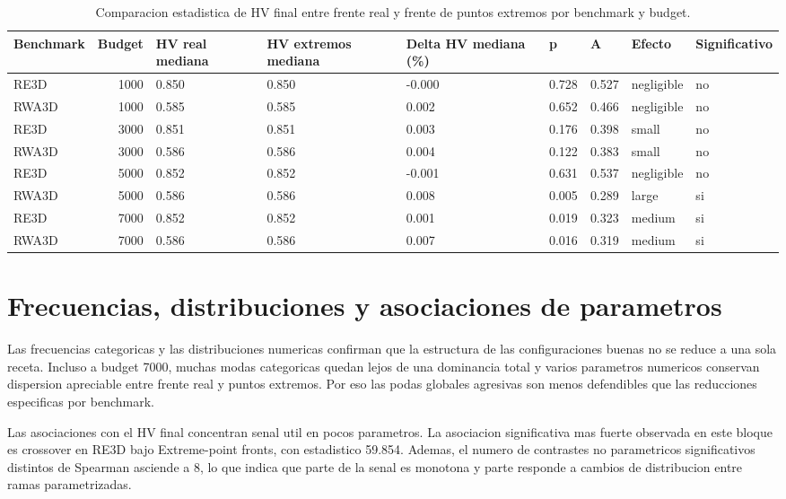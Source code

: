 \documentclass[11pt,a4paper]{article}
\begin{document}
{\scriptsize
\begin{table}[p]
\centering
\caption{Comparacion estadistica de HV final entre frente real y frente de puntos extremos por benchmark y budget.}
\label{tab:front_type_stats}
\begin{tabular}{lrlllllll}
\toprule
Benchmark & Budget & HV real mediana & HV extremos mediana & Delta HV mediana (\%) & p & A & Efecto & Significativo \\
\midrule
RE3D & 1000 & 0.850 & 0.850 & -0.000 & 0.728 & 0.527 & negligible & no \\
RWA3D & 1000 & 0.585 & 0.585 & 0.002 & 0.652 & 0.466 & negligible & no \\
RE3D & 3000 & 0.851 & 0.851 & 0.003 & 0.176 & 0.398 & small & no \\
RWA3D & 3000 & 0.586 & 0.586 & 0.004 & 0.122 & 0.383 & small & no \\
RE3D & 5000 & 0.852 & 0.852 & -0.001 & 0.631 & 0.537 & negligible & no \\
RWA3D & 5000 & 0.586 & 0.586 & 0.008 & 0.005 & 0.289 & large & si \\
RE3D & 7000 & 0.852 & 0.852 & 0.001 & 0.019 & 0.323 & medium & si \\
RWA3D & 7000 & 0.586 & 0.586 & 0.007 & 0.016 & 0.319 & medium & si \\
\bottomrule
\end{tabular}
\end{table}

}

\section{Frecuencias, distribuciones y asociaciones de parametros}

Las frecuencias categoricas y las distribuciones numericas confirman que la estructura de las configuraciones buenas no se reduce a una sola receta. Incluso a budget 7000, muchas modas categoricas quedan lejos de una dominancia total y varios parametros numericos conservan dispersion apreciable entre frente real y puntos extremos. Por eso las podas globales agresivas son menos defendibles que las reducciones especificas por benchmark.

Las asociaciones con el HV final concentran senal util en pocos parametros. La asociacion significativa mas fuerte observada en este bloque es crossover en RE3D bajo Extreme-point fronts, con estadistico 59.854. Ademas, el numero de contrastes no parametricos significativos distintos de Spearman asciende a 8, lo que indica que parte de la senal es monotona y parte responde a cambios de distribucion entre ramas parametrizadas.
\end{document}
